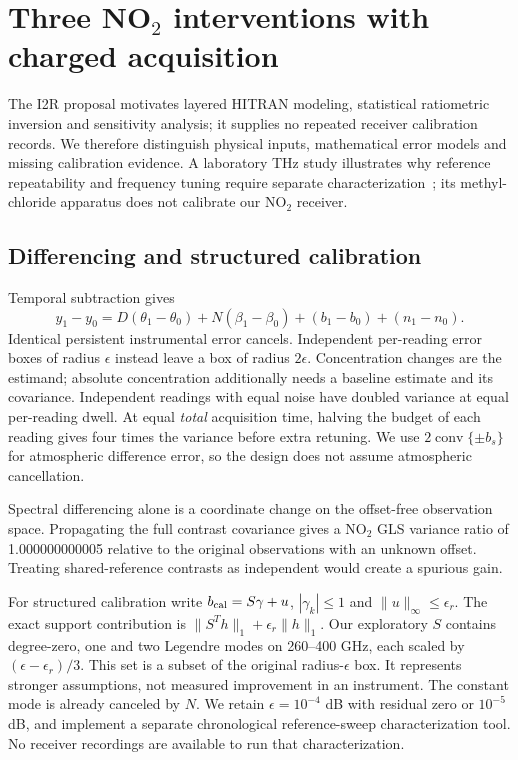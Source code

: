 \section{Three NO$_2$ interventions with charged acquisition}
The I2R proposal motivates layered HITRAN modeling, statistical ratiometric inversion and sensitivity analysis; it supplies no repeated receiver calibration records. We therefore distinguish physical inputs, mathematical error models and missing calibration evidence. A laboratory THz study illustrates why reference repeatability and frequency tuning require separate characterization~\cite{bjarnason2008}; its methyl-chloride apparatus does not calibrate our NO$_2$ receiver.

\subsection{Differencing and structured calibration}
Temporal subtraction gives
\[
y_1-y_0=D(\theta_1-\theta_0)+N(\beta_1-\beta_0)
+(b_1-b_0)+(n_1-n_0).
\]
Identical persistent instrumental error cancels. Independent per-reading error boxes of radius $\epsilon$ instead leave a box of radius $2\epsilon$. Concentration changes are the estimand; absolute concentration additionally needs a baseline estimate and its covariance. Independent readings with equal noise have doubled variance at equal per-reading dwell. At equal \emph{total} acquisition time, halving the budget of each reading gives four times the variance before extra retuning. We use $2\operatorname{conv}\{\pm b_s\}$ for atmospheric difference error, so the design does not assume atmospheric cancellation.

Spectral differencing alone is a coordinate change on the offset-free observation space. Propagating the full contrast covariance gives a NO$_2$ GLS variance ratio of 1.000000000005 relative to the original observations with an unknown offset. Treating shared-reference contrasts as independent would create a spurious gain.

For structured calibration write $b_{\rm cal}=S\gamma+u$, $|\gamma_k|\le1$ and $\|u\|_\infty\le\epsilon_r$. The exact support contribution is $\|S^Th\|_1+\epsilon_r\|h\|_1$. Our exploratory $S$ contains degree-zero, one and two Legendre modes on 260--400 GHz, each scaled by $(\epsilon-\epsilon_r)/3$. This set is a subset of the original radius-$\epsilon$ box. It represents stronger assumptions, not measured improvement in an instrument. The constant mode is already canceled by $N$. We retain $\epsilon=10^{-4}$ dB with residual zero or $10^{-5}$ dB, and implement a separate chronological reference-sweep characterization tool. No receiver recordings are available to run that characterization.

